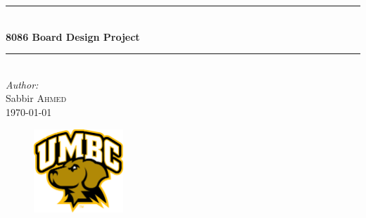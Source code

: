 \documentclass[12pt]{article}
\begin{document}
    \begin{titlepage}

        \newcommand{\HRule}{\rule{\linewidth}{0.5mm}}

        \center %


        \HRule \\[0.5cm]
        { \huge \bfseries 8086 Board Design Project}\\[0.4cm] %
        \HRule \\[1.5cm]
         

        \Large \emph{Author:}\\
        Sabbir \textsc{Ahmed}\\[3cm] %


        {\large \today}\\[2cm]


        \begin{figure}[h]
            \begin{center}
                \includegraphics[width=0.3\textwidth]{figures/uni_logo.jpg}
                \label{fig:uni_logo}
            \end{center}
        \end{figure}

        \vfill %


    \end{titlepage}
\end{document}
